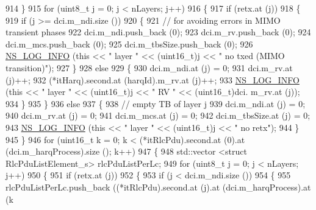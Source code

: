\begin{DoxyCode}
914             \}
915           \textcolor{keywordflow}{for} (uint8\_t j = 0; j < nLayers; j++)
916             \{
917               \textcolor{keywordflow}{if} (retx.at (j))
918                 \{
919                   \textcolor{keywordflow}{if} (j >= dci.m\_ndi.size ())
920                     \{
921                       \textcolor{comment}{// for avoiding errors in MIMO transient phases}
922                       dci.m\_ndi.push\_back (0);
923                       dci.m\_rv.push\_back (0);
924                       dci.m\_mcs.push\_back (0);
925                       dci.m\_tbsSize.push\_back (0);
926                       \hyperlink{group__logging_gafbd73ee2cf9f26b319f49086d8e860fb}{NS\_LOG\_INFO} (\textcolor{keyword}{this} << \textcolor{stringliteral}{" layer "} << (uint16\_t)j << \textcolor{stringliteral}{" no txed (MIMO
       transition)"});
927                     \}
928                   \textcolor{keywordflow}{else}
929                     \{
930                       dci.m\_ndi.at (j) = 0;
931                       dci.m\_rv.at (j)++;
932                       (*itHarq).second.at (harqId).m\_rv.at (j)++;
933                       \hyperlink{group__logging_gafbd73ee2cf9f26b319f49086d8e860fb}{NS\_LOG\_INFO} (\textcolor{keyword}{this} << \textcolor{stringliteral}{" layer "} << (uint16\_t)j << \textcolor{stringliteral}{" RV "} << (uint16\_t)dci.
      m\_rv.at (j));
934                     \}
935                 \}
936               \textcolor{keywordflow}{else}
937                 \{
938                   \textcolor{comment}{// empty TB of layer j}
939                   dci.m\_ndi.at (j) = 0;
940                   dci.m\_rv.at (j) = 0;
941                   dci.m\_mcs.at (j) = 0;
942                   dci.m\_tbsSize.at (j) = 0;
943                   \hyperlink{group__logging_gafbd73ee2cf9f26b319f49086d8e860fb}{NS\_LOG\_INFO} (\textcolor{keyword}{this} << \textcolor{stringliteral}{" layer "} << (uint16\_t)j << \textcolor{stringliteral}{" no retx"});
944                 \}
945             \}
946           \textcolor{keywordflow}{for} (uint16\_t k = 0; k < (*itRlcPdu).second.at (0).at (dci.m\_harqProcess).size (); k++)
947             \{
948               std::vector <struct RlcPduListElement\_s> rlcPduListPerLc;
949               \textcolor{keywordflow}{for} (uint8\_t j = 0; j < nLayers; j++)
950                 \{
951                   \textcolor{keywordflow}{if} (retx.at (j))
952                     \{
953                       \textcolor{keywordflow}{if} (j < dci.m\_ndi.size ())
954                         \{
955                           rlcPduListPerLc.push\_back ((*itRlcPdu).second.at (j).at (dci.m\_harqProcess).at (k

\end{DoxyCode}
